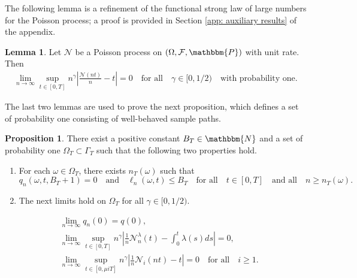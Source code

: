 \documentclass[a4paper, 12pt]{article}
\theoremstyle{definition}
\newtheorem{proposition}[theorem]{Proposition}
\newtheorem{lemma}[theorem]{Lemma}
\newcommand{\prob}{\mathbbm{P}}
\newcommand{\calF}{\mathcal{F}}
\newcommand{\calN}{\mathcal{N}}
\newcommand{\N}{\mathbbm{N}}
\begin{document}
The following lemma is a refinement of the functional strong law of large numbers for the Poisson process; a proof is provided in Section \ref{app: auxiliary results} of the appendix.

\begin{lemma}
	\label{lem: refined fslln for poisson process}
	Let $\calN$ be a Poisson process on $(\Omega, \calF, \prob)$ with unit rate. Then
	\begin{align*}
		\lim_{n \to \infty} \sup_{t \in [0, T]} n^\gamma\left|\frac{\calN(n t)}{n} - t\right| = 0 \quad \text{for all} \quad \gamma \in [0, 1 / 2) \quad \text{with probability one}.
	\end{align*}
\end{lemma}

The last two lemmas are used to prove the next proposition, which defines a set of probability one consisting of well-behaved sample paths.

\begin{proposition}
	\label{prop: definition of Omega_T}
	There exist a positive constant $B_T \in \N$ and a set of probability one $\Omega_T \subset \Gamma_T$ such that the following two properties hold.
	\begin{enumerate}
		\item[(a)] For each $\omega \in \Omega_T$, there exists $n_T(\omega)$ such that
		\begin{equation}
			\label{eq: boundedness of occupancy states and thresholds}
			q_n(\omega, t, B_T + 1) = 0 \quad \text{and} \quad \ell_n(\omega, t) \leq B_T \quad \text{for all} \quad t \in [0, T] \quad \text{and all} \quad n \geq n_T(\omega).
		\end{equation}
		
		\item[(b)] The next limits hold on $\Omega_T$ for all $\gamma \in [0, 1/2)$.
	\end{enumerate}
	\begin{subequations}
		\begin{align}
			&\lim_{n \to \infty} q_n(0) = q(0), \label{seq: convergence of initial conditions 2} \\
			&\lim_{n \to \infty} \sup_{t \in [0, T]} n^\gamma\left|\frac{1}{n} \calN_n^\lambda(t) - \int_0^t \lambda(s)ds\right| = 0, \label{seq: fslln for arrivals 2} \\
			&\lim_{n \to \infty} \sup_{t \in [0, \mu iT]} n^\gamma\left|\frac{1}{n} \calN_i(nt) - t\right| = 0 \quad \text{for all} \quad i \geq 1. \label{seq: fslln for departures 2}
		\end{align}
	\end{subequations}
\end{proposition}
\end{document}
